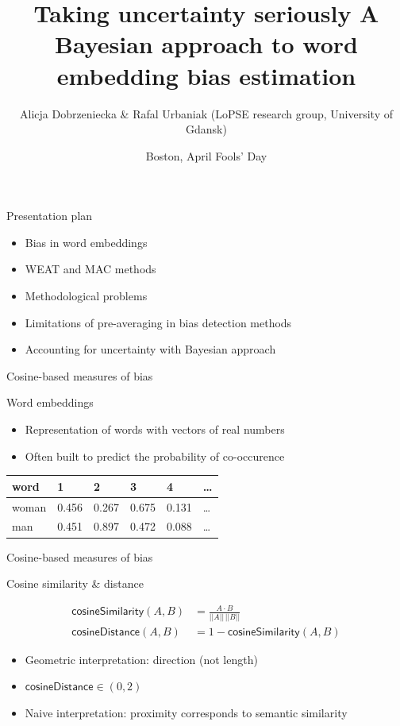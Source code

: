 \documentclass[
  10pt,
  ignorenonframetext,
  x11names, dvipsnames, bibspacing,natbib]{beamer}
\title{\Large Taking uncertainty seriously \newline \normalsize A
Bayesian approach to word embedding bias estimation}
\author{Alicja Dobrzeniecka \& Rafal Urbaniak
\footnotesize \newline (LoPSE research group, University of Gdansk)}
\date{Boston, April Fools' Day}
\providecommand{\tightlist}{%
  \setlength{\itemsep}{0pt}\setlength{\parskip}{0pt}}
\begin{document}
\frame{\titlepage}

\begin{frame}{Presentation plan}
\protect\hypertarget{presentation-plan}{}
\begin{itemize}
\tightlist
\item
  Bias in word embeddings
\item
  WEAT and MAC methods
\item
  Methodological problems
\item
  Limitations of pre-averaging in bias detection methods
\item
  Accounting for uncertainty with Bayesian approach
\end{itemize}
\end{frame}

\begin{frame}{Cosine-based measures of bias}
\protect\hypertarget{cosine-based-measures-of-bias}{}
\begin{block}{Word embeddings}
\protect\hypertarget{word-embeddings}{}
\begin{itemize}
\item
  Representation of words with vectors of real numbers
\item
  Often built to predict the probability of co-occurence
\end{itemize}

\begin{longtable}[]{@{}llllll@{}}
\toprule
word & 1 & 2 & 3 & 4 & \ldots{} \\
\midrule
\endhead
woman & 0.456 & 0.267 & 0.675 & 0.131 & \ldots{} \\
man & 0.451 & 0.897 & 0.472 & 0.088 & \ldots{} \\
\bottomrule
\end{longtable}
\end{block}
\end{frame}

\begin{frame}{Cosine-based measures of bias}
\protect\hypertarget{cosine-based-measures-of-bias-1}{}
\begin{block}{Cosine similarity \& distance}
\protect\hypertarget{cosine-similarity-distance}{}
\vspace{-4mm}

\begin{align} \tag{Sim}
\mathsf{cosineSimilarity}(A,B) & = \frac{A \cdot B}{\vert \vert A \vert \vert \,\vert \vert B \vert \vert}
\\
\tag{Distance}
\mathsf{cosineDistance}(A,B) &  = 1 - \mathsf{cosineSimilarity}(A,B)
\end{align}

\begin{itemize}
\item
  Geometric interpretation: direction (not length)
\item
  \(\mathsf{cosineDistance}\in (0, 2)\)
\item
  Naive interpretation: proximity corresponds to semantic similarity
\end{itemize}
\end{block}
\end{frame}
\end{document}
